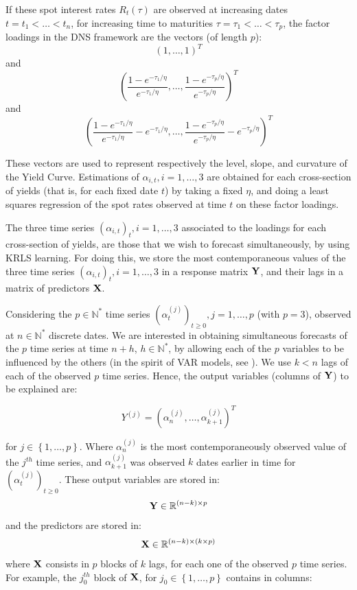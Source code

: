 If these spot interest rates $R_t(\tau)$ are observed at increasing dates $t = t_1 < \ldots < t_n$, for increasing time to maturities $\tau = \tau_1 < \ldots < \tau_p$, the factor loadings in the DNS framework are the vectors (of length $p$):  
$$
(1, \ldots, 1)^T
$$
and
$$
\left(\frac{1-e^{-\tau_1/\eta}}{e^{-\tau_1/\eta}}, \ldots, \frac{1-e^{-\tau_p/\eta}}{e^{-\tau_p/\eta}}\right)^T
$$ 
and 
$$
\left(\frac{1-e^{-\tau_1/\eta}}{e^{-\tau_1/\eta}} - e^{-\tau_1/\eta}, \ldots, \frac{1-e^{-\tau_p/\eta}}{e^{-\tau_p/\eta}} - e^{-\tau_p/\eta}\right)^T
$$ 

\medskip

These vectors are used to represent respectively the level, slope, and curvature of the Yield Curve. Estimations of $\alpha_{i, t}, i = 1, \ldots, 3$ are obtained for each cross-section of yields (that is, for each fixed date $t$) by taking a fixed $\eta$, and doing a least squares regression of the spot rates observed at time $t$ on these factor loadings. 

\medskip

The three time series $(\alpha_{i, t})_t, i = 1, \ldots, 3$ associated to the loadings for each cross-section of yields, are those that we wish to forecast simultaneously, by using KRLS learning. For doing this, we store the most contemporaneous values of the three time series $(\alpha_{i, t})_t, i = 1, \ldots, 3$ in a response matrix ${\bf Y}$, and their lags in a matrix of predictors ${\bf X}$. 

\medskip

Considering the $p \in \mathbb{N}^*$ time series $(\alpha_t^{(j)})_{t \geq 0}, j = 1, \ldots, p$ (with $p = 3$),
observed at $n \in \mathbb{N}^*$ discrete dates. We are interested in
obtaining simultaneous forecasts of the $p$ time series at time $n+h$, $h \in
\mathbb{N}^*$, by allowing each of the $p$ variables to be influenced by the
others (in the spirit of VAR models, see \cite{lutkepohl2005new}). We use $k < n$ lags of each of the observed $p$ time series. Hence, the output variables (columns of ${\bf Y}$) to be explained are:

\begin{equation}
Y^{(j)} = \left(\alpha^{(j)}_n, \ldots, \alpha^{(j)}_{k+1} \right)^T
\end{equation}

for $j \in \left\lbrace 1, \ldots,
p \right\rbrace$. Where $\alpha^{(j)}_n$ is the most contemporaneously observed value
of the $j^{th}$ time series, and $\alpha^{(j)}_{k+1}$ was observed $k$ dates earlier
in time for $(\alpha^{(j)}_t)_{t \geq 0}$. These output variables are stored in: $$ {\bf Y} \in \mathbb{R}^{(n-k) \times p} $$ and the predictors are
stored in: $$ {\bf X} \in \mathbb{R}^{(n-k) \times (k \times p)} $$
where ${\bf X}$ consists in $p$ blocks of $k$ lags, for each one of the observed
$p$ time series. For example, the $j_0^{th}$ block of ${\bf X}$, for $j_0 \in
\left\lbrace 1, \ldots, p \right\rbrace$  contains in columns:

